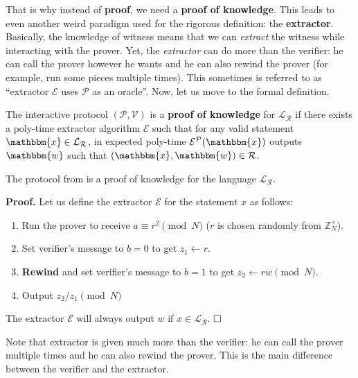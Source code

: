 \documentclass[../../book.tex]{subfiles}
\begin{document}
That is why instead of \textbf{proof}, we need a \textbf{proof of knowledge}.
This leads to even another weird paradigm used for the rigorous definition: the
\textbf{extractor}. Basically, the knowledge of witness means that we can
\textit{extract} the witness while interacting with the prover. Yet, the
\textit{extractor} can do more than the verifier: he can call the prover however
he wants and he can also rewind the prover (for example, run some pieces
multiple times). This sometimes is referred to as ``extractor $\mathcal{E}$ uses
$\mathcal{P}$ as an oracle''. Now, let us move to the formal definition.

\begin{definition}
    The interactive protocol $(\mathcal{P}, \mathcal{V})$ is a \textbf{proof of
    knowledge} for $\mathcal{L}_{\mathcal{R}}$ if there exists a poly-time extractor
    algorithm $\mathcal{E}$ such that for any valid statement $\mathbbm{x} \in
    \mathcal{L}_{\mathcal{R}}$, in expected poly-time
    $\mathcal{E}^{\mathcal{P}}(\mathbbm{x})$ outputs $\mathbbm{w}$ such that
    $(\mathbbm{x},\mathbbm{w}) \in \mathcal{R}$.
\end{definition}

\begin{lemma}
    The protocol from  is a proof of
    knowledge for the language $\mathcal{L}_{\mathcal{R}}$. 
\end{lemma}

\textbf{Proof.} Let us define the extractor $\mathcal{E}$ for the statement $x$ as follows:
\begin{enumerate}
    \item Run the prover to receive $a \equiv r^2 \pmod{N}$ ($r$ is chosen randomly from $\mathbb{Z}_N^{\times}$).
    \item Set verifier's message to $b=0$ to get $z_1 \gets r$.
    \item \textbf{Rewind} and set verifier's message to $b=1$ to get $z_2 \gets rw \pmod{N}$.
    \item Output $z_2/z_1 \pmod{N}$
\end{enumerate}

The extractor $\mathcal{E}$ will always output $w$ if $x \in
\mathcal{L}_{\mathcal{R}}$. $\hfill\Box$

\begin{remark}
    Note that extractor is given much more than the verifier: he can call the
    prover multiple times and he can also rewind the prover. This is the main
    difference between the verifier and the extractor.    
\end{remark}
\end{document}
